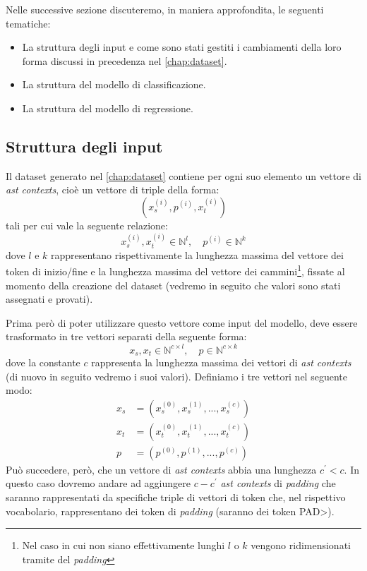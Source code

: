 Nelle successive sezione discuteremo, in maniera approfondita, le seguenti tematiche:
    \begin{itemize}
        \item La struttura degli input e come sono stati gestiti i cambiamenti della loro forma discussi in precedenza nel \autoref{chap:dataset}.
        \item La struttura del modello di classificazione.
        \item La struttura del modello di regressione.
    \end{itemize}


\subsection{Struttura degli input}
Il dataset generato nel \autoref{chap:dataset} contiene per ogni suo elemento un vettore di \textit{ast contexts}, cioè un vettore di triple della forma:
    \[(x_s^{(i)}, p^{(i)}, x_t^{(i)})\]
tali per cui vale la seguente relazione:
    \[x_s^{(i)}, x_t^{(i)} \in \mathbb{N}^{l}, \quad p^{(i)} \in \mathbb{N}^{k}\]
dove $l$ e $k$ rappresentano rispettivamente la lunghezza massima del vettore dei token di inizio/fine e la lunghezza massima del vettore dei cammini\footnote{Nel caso in cui non siano effettivamente lunghi $l$ o $k$ vengono ridimensionati tramite del \textit{padding}},
fissate al momento della creazione del dataset (vedremo in seguito che valori sono stati assegnati e provati).


Prima però di poter utilizzare questo vettore come input del modello, deve essere trasformato in tre vettori separati della seguente forma:
\[x_s, x_t \in \mathbb{N}^{c \times l}, \quad p \in \mathbb{N}^{c \times k}\]
dove la constante $c$ rappresenta la lunghezza massima dei vettori di \textit{ast contexts} (di nuovo in seguito vedremo i suoi valori).
Definiamo i tre vettori nel seguente modo:
    \begin{align*}
        x_s &= (x_s^{(0)}, x_s^{(1)}, ..., x_s^{(c)}) \\
        x_t &= (x_t^{(0)}, x_t^{(1)}, ..., x_t^{(c)}) \\
        p &= (p^{(0)}, p^{(1)}, ..., p^{(c)}) 
    \end{align*}
Può succedere, però, che un vettore di \textit{ast contexts} abbia una lunghezza $c^{\prime} < c$.
In questo caso dovremo andare ad aggiungere $c - c^{\prime}$ \textit{ast contexts} di \textit{padding} che saranno rappresentati da specifiche triple di vettori di token che, nel rispettivo vocabolario, rappresentano dei token di \textit{padding} (saranno dei token \<PAD\textgreater).

